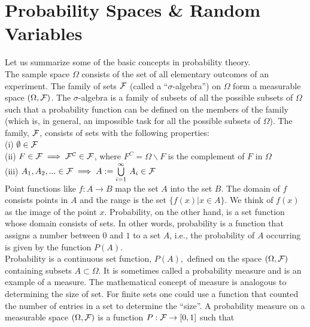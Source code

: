 \section{Probability Spaces \& Random Variables}
\label{sec:Probability}
Let us summarize some of the basic concepts in probability theory. \\
 
The sample space $\Omega$ consists of the set of all elementary outcomes of an experiment. The family of sets $\cal{F}$ (called a ``$\sigma$-algebra'') on $\Omega$ form a measurable space 
$(\Omega,{\cal F})$. The $\sigma$-algebra is a family of subsets of all the possible subsets of $\Omega$ such that a probability function can be defined on the members of the family (which is, in general, an impossible task for all the possible subsets of $\Omega$). The family, ${\cal F}$, consists of sets with the following properties:\\

(i) $\emptyset \in {\cal F}$\\
(ii) $F\in \cal{F} \implies F^C \in {\cal F}$, where $F^C = \Omega \backslash F$ is the complement of $F$ in $\Omega$\\
(iii) $A_1, A_2, ... \in {\cal F} \implies A := \bigcup\limits_{i=1}^{\infty} \, A_i \in \cal{F}$ \\ 

{\elevenit Point functions}\/ like $f: A \to B$ map the set $A$ into the set $B$. The domain of $f$ consists points in $A$ and the range is the set $\{f(x) | x \in A \}$. We think of $f(x)$ as the {\elevenit image}\/ of the point $x$. Probability, on the other hand, is a {\elevenit set function}\/ whose domain consists of sets. In other words, probability is a function that assigns a number between $0$ and $1$ to a set $A$, i.e., the probability of $A$ occurring is given by the function $P(A)$.\\

Probability is a {\elevenit continuous set function}, $P(A),$ defined on the space $(\Omega,{\cal F})$ containing subsets $A  \subset \Omega$. It is sometimes called a probability measure and is an example of a measure. The mathematical concept of measure is analogous to determining the size of set. For finite sets one could use a function that counted the number of entries in a set to determine the ``size''.
 A probability measure on a measurable space $(\Omega, {\cal F})$ is a function $P: {\cal F} \rightarrow [0,1]$ such that \\


